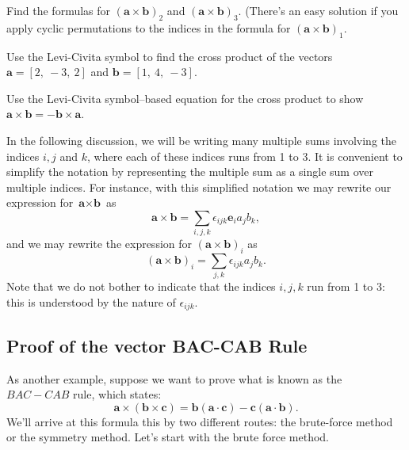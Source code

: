 \begin{exercise}{}
Find the formulas for
$(\textbf{a} \times \textbf{b})_2$ and $(\textbf{a} \times \textbf{b})_3$.  (There's an easy solution if you apply cyclic permutations to the indices in the formula for $(\textbf{a} \times \textbf{b})_1$.
\end{exercise}

\begin{exercise}{}
Use the Levi-Civita symbol to find the cross product of the vectors $\textbf{a}=[2,~-3,~2]$ and $\textbf{b}=[1,~4,~-3]$.
\end{exercise}

\begin{exercise}{}
Use the Levi-Civita symbol--based equation for the cross product to show $\textbf{a} \times \textbf{b} = -\textbf{b} \times \textbf{a}$.
\end{exercise}   

In the following discussion, we will be writing many multiple sums involving the indices $i,j$ and $k$, where each of these indices runs from 1 to 3. It is convenient to simplify the notation by representing the multiple sum as a single sum over multiple indices. For instance, with this simplified notation we may rewrite our expression for 
$\textbf{a} \times \textbf{b}$ as
\[\textbf{a} \times \textbf{b} =  \sum_{i,j,k} \epsilon_{ijk} \textbf{e}_i  a_j b_k, \]
and we may rewrite the expression for 
$(\textbf{a} \times \textbf{b})_i$ as
\[ (\textbf{a} \times \textbf{b})_i = \sum_{j,k} \epsilon_{ijk} a_j b_k. \]
Note that we do not bother to indicate that the indices $i,j,k$ run from 1 to 3: this is understood by the nature of $\epsilon_{ijk}$.

\subsection{Proof of the vector BAC-CAB Rule}
\label{subsec:SigmaApp:LeviCivita:BAC-CAB-Rule}

As another example, suppose we want to prove what is known as the $BAC-CAB$ rule, which states:
\[ \textbf{a} \times \left( \textbf{b} \times \textbf{c} \right) = \textbf{b} \left( \textbf{a} \cdot \textbf{c} \right) - \textbf{c} \left( \textbf{a} \cdot \textbf{b} \right). \]
We'll arrive at this formula this by two different routes: the brute-force method or the symmetry method.  Let's start with the brute force method.

